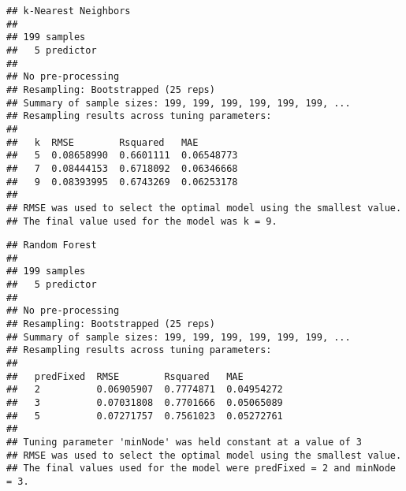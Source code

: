 \documentclass[11pt,]{article}
\newenvironment{Shaded}{\begin{snugshade}}{\end{snugshade}}
\newcommand{\NormalTok}[1]{#1}
\newcommand{\OperatorTok}[1]{\textcolor[rgb]{0.81,0.36,0.00}{\textbf{#1}}}
\begin{document}
\begin{Shaded}
\end{Shaded}

\begin{verbatim}
## k-Nearest Neighbors 
## 
## 199 samples
##   5 predictor
## 
## No pre-processing
## Resampling: Bootstrapped (25 reps) 
## Summary of sample sizes: 199, 199, 199, 199, 199, 199, ... 
## Resampling results across tuning parameters:
## 
##   k  RMSE        Rsquared   MAE       
##   5  0.08658990  0.6601111  0.06548773
##   7  0.08444153  0.6718092  0.06346668
##   9  0.08393995  0.6743269  0.06253178
## 
## RMSE was used to select the optimal model using the smallest value.
## The final value used for the model was k = 9.
\end{verbatim}

\begin{Shaded}
\end{Shaded}

\begin{verbatim}
## Random Forest 
## 
## 199 samples
##   5 predictor
## 
## No pre-processing
## Resampling: Bootstrapped (25 reps) 
## Summary of sample sizes: 199, 199, 199, 199, 199, 199, ... 
## Resampling results across tuning parameters:
## 
##   predFixed  RMSE        Rsquared   MAE       
##   2          0.06905907  0.7774871  0.04954272
##   3          0.07031808  0.7701666  0.05065089
##   5          0.07271757  0.7561023  0.05272761
## 
## Tuning parameter 'minNode' was held constant at a value of 3
## RMSE was used to select the optimal model using the smallest value.
## The final values used for the model were predFixed = 2 and minNode = 3.
\end{verbatim}

\begin{Shaded}
\end{Shaded}
\end{document}
